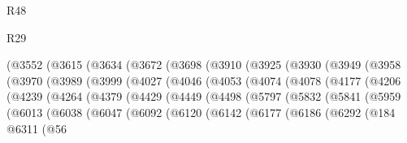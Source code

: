 \begin{lexlean}{R48}
\begin{lexlean}{R29}
\begin{coremodule}
{{{{{{{{{{{{{{{{{{{{{{{{{{{{{{{{{{{{{{{{{{{{{{{{{{{{{{{{{{{{{{{{{{{{{{{{{{{{{{{{{{{{{{{{{{{{{{{{{{{{{{{{{{{{{{{{{{{{{{{{{{{{{{{{{{{{{{{{{{{{{{{{{{{{{{{{{{{{{{{{{{{{{{{{{{{{{{{{{{{{{{{{{{{{{{{{{{{{{{{{{{{{{{{{{{{{{{{{{{                (@3552
                  (@3615
                    (@3634
                      (@3672
                        (@3698
                          (@3910
                            (@3925
                              (@3930
                                (@3949
                                  (@3958
                                    (@3970
                                      (@3989
                                        (@3999
                                          (@4027
                                            (@4046
                                              (@4053
                                                (@4074
                                                  (@4078
                                                    (@4177
                                                      (@4206
                                                        (@4239
                                                          (@4264
                                                            (@4379
                                                              (@4429
                                                                (@4449
                                                                  (@4498
                                                                    (@5797
                                                                      (@5832
                                                                        (@5841
                                                                          (@5959
                                                                            (@6013
                                                                              (@6038
                                                                                (@6047
                                                                                  (@6092
                                                                                    (@6120
                                                                                      (@6142
                                                                                        (@6177
                                                                                          (@6186
                                                                                            (@6292
                                                                                              (@184
                                                                                                @6311
                                                                                                (@56
}}}}}}}}}}}}}}}}}}}}}}}}}}}}}}}}}}}}}}}}}}}}}}}}}}}}}}}}}}}}}}}}}}}}}}}}}}}}}}}}}}}}}}}}}}}}}}}}}}}}}}}}}}}}}}}}}}}}}}}}}}}}}}}}}}}}}}}}}}}}}}}}}}}}}}}}}}}}}}}}}}}}}}}}}}}}}}}}}}}}}}}}}}}}}}}}}}}}}}}}}}}}}}}}}}}}}}}}}}
\end{coremodule}
\end{lexlean}
\end{lexlean}
